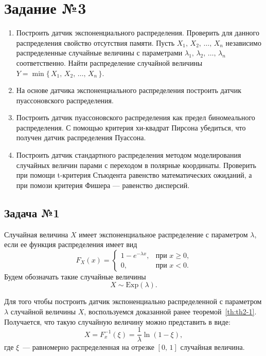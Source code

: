 \section{Задание №3}

\begin{enumerate}
        \item Построить датчик экспоненциального распределения. 
        Проверить для данного распределения свойство отсутствия памяти. Пусть $X_1,\,X_2,\,\ldots,\,X_n$ независимо распределенные случайные величины с параметрами $\lambda_1,\,\lambda_2,\,\ldots,\,\lambda_n$ соответственно. 
        Найти распределение случайной величины $Y = \min\{\,X_1,\,X_2,\,\ldots,\,X_n\,\}$.
        \item На основе датчика экспоненциального распределения построить датчик пуассоновского распределения.
        \item Построить датчик пуассоновского распределения как предел биномеального распределения.
        С помощью критерия хи-квадрат Пирсона убедиться, что получен датчик распределения Пуассона.
        \item Построить датчик стандартного распределения методом моделирования случайных величин парами с переходом в полярные координаты. Проверить при помощи t-критерия Стьюдента равенство математических ожиданий, а при помози критерия Фишера --- равенство дисперсий.
\end{enumerate}

\subsection{Задача №1}

\begin{definition}
        Случайная величина $X$ имеет экспоненциальное распределение с параметром $\lambda$, если ее функция распределения имеет вид
$$
        F_X(x) = 
        \begin{cases}
                1 - e^{-\lambda x},& \mbox{при $x \geqslant 0$,} \\
                0, & \mbox{при $x < 0$.}
        \end{cases}
$$
        Будем обозначать такие случайные величины
$$
        X \sim \mbox{Exp}(\lambda).
$$
\end{definition}

Для того чтобы построить датчик экспоненциально распределенной с параметром $\lambda$ случайной величины $X$, воспользуемся доказанной ранее теоремой~\ref{th:th2-1}. Получается, что такую случайную величину можно представить в виде:
$$
        X =
        F_x^{-1}(\xi) =
        \frac{1}{\lambda}\ln(1 - \xi),
$$
где $\xi$~--- равномерно распределенная на отрезке $[0,\,1]$ случайная величина.

